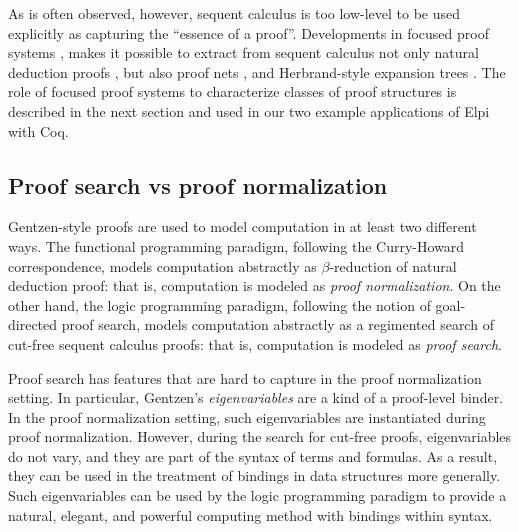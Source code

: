 
As is often observed, however, sequent calculus is too low-level to be
used explicitly as capturing the ``essence of a proof''.  
Developments in focused proof systems \cite{andreoli92jlc,liang09tcs},
makes it possible to extract from sequent calculus not only natural
deduction proofs \cite{pimentel16lsfa}, but also proof nets
\cite{chaudhuri08tcs}, and Herbrand-style expansion trees
\cite{chaudhuri16jlc}.  The role of focused proof systems to
characterize classes of proof structures is described in the next
section and used in our two example applications of Elpi with Coq.



\subsection{Proof search vs proof normalization}

Gentzen-style proofs are used to model computation in at least two
different ways.  The functional programming paradigm, following the
Curry-Howard correspondence, models computation abstractly as 
$\beta$-reduction of natural deduction proof: that is, computation is
modeled as \emph{proof normalization}.  On the other hand, the
logic programming paradigm, following the notion of goal-directed
proof search, models computation abstractly as a regimented search of
cut-free sequent calculus proofs: that is, computation is modeled
as \emph{proof search}.

Proof search has features that are hard to capture in the proof
normalization setting.  In particular, Gentzen's \emph{eigenvariables}
are a kind of a proof-level binder.  In the proof normalization
setting, such eigenvariables are instantiated during proof
normalization.  However, during the search for cut-free proofs,
eigenvariables do not vary, and they are part of the syntax of terms
and formulas.  As a result, they can be used in the treatment of
bindings in data structures more generally.  Such eigenvariables can
be used by the logic programming paradigm to provide a natural,
elegant, and powerful computing method with bindings within syntax.

